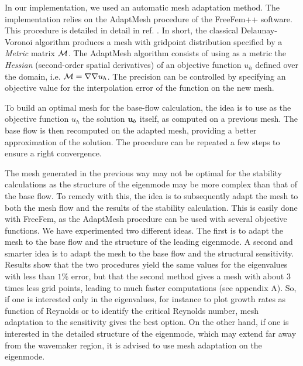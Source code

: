 \documentclass[twocolumn,10pt]{asme2ej}
\begin{document}
In our implementation, we used an automatic mesh adaptation method. %
The implementation relies on the AdaptMesh procedure of the FreeFem++ software. This procedure is detailed in detail in ref. \cite{adapt}. 
In short, the classical Delaunay-Voronoi algorithm produces a mesh with gridpoint distribution specified by a {\em Metric } matrix $\cal M$. The AdaptMesh algorithm consists of using as a metric the {\em Hessian} (second-order spatial derivatives) of an objective function $u_h$ defined over the domain, i.e. ${\cal M} = \nabla \nabla u_h$. The precision can be controlled by specifying an objective value for the interpolation error of the function on the new mesh.

To build an optimal mesh for the base-flow calculation, the idea is to use as the objective function $u_h$ the solution ${\bf u}_b$ itself, as computed on a previous mesh.%
The base flow is then recomputed on the adapted mesh, providing a better approximation of the solution. The procedure can be repeated a few steps to ensure a right convergence.

The mesh generated in the previous way may not be optimal for the stability calculations as the structure of the eigenmode may be more complex than that of the base flow. To remedy with this, the idea is to subsequently adapt the mesh to both the mesh flow and the results of the stability calculation. This is easily done with FreeFem, as the  AdaptMesh procedure can be used with several objective functions. We have experimented two different ideas. The first is to adapt the mesh to the base flow and the structure of the leading eigenmode. A second and smarter idea is to adapt the mesh to the base flow and the structural sensitivity. Results show that the two procedures yield the same values for the eigenvalues with less than $1\%$ error, but that the second method gives a mesh with about 3 times less grid points, leading to much faster computations (see appendix A). So, if one is interested only in the eigenvalues, for instance to plot growth rates as function of Reynolds or to identify the critical Reynolds number, mesh adaptation to the sensitivity gives the best option. On the other hand, if one is interested in the detailed structure of the eigenmode, which may extend far away from the wavemaker region, it is advised to use mesh adaptation on the eigenmode. 
\end{document}
